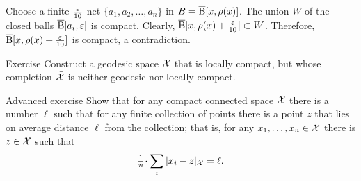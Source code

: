Choose a finite $\tfrac{\varepsilon}{10}$-net $\{a_1,a_2,\dots,a_n\}$ in $B=\overline{\mathrm{B}}{}[x,\rho(x)]$.
The union $W$ of the closed balls $\overline{\mathrm{B}}{}[a_i,\varepsilon]$ is compact.
Clearly,
$\overline{\mathrm{B}}{}[x,\rho(x)+\frac{\varepsilon}{10}]\subset W$.
Therefore, $\overline{\mathrm{B}}{}[x,\rho(x)+\frac{\varepsilon}{10}]$ is compact,
a contradiction.
\qeds

\begin{thm}{Exercise}\label{exercise from BH}
Construct a geodesic space $\mathcal{X}$ that is locally compact,
but whose completion $\bar{\mathcal{X}}$ is neither geodesic nor locally compact.
\end{thm}


\begin{thm}{Advanced exercise}\label{ex:gross}
Show that for any compact connected space $\mathcal{X}$ there is a number $\ell$ such that for any finite collection of points there is a point $z$ that lies on average distance $\ell$ from the collection;
that is, for any $x_1,\dots,x_n\in \mathcal{X}$ there is $z\in \mathcal{X}$ such that
\[\tfrac1n\cdot\sum_i|x_i-z|_{\spc{X}}=\ell.\]
\end{thm}






